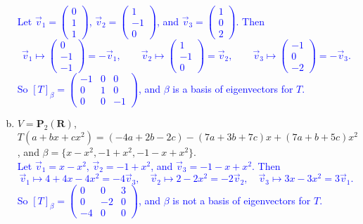 \documentclass[a4paper,11pt]{article}
\newcommand{\R}{\mathbf{R}}
\newcommand{\PP}{\mathbf{P}}
\newcommand{\blue}[1]{\textcolor{blue}{#1}}
\begin{document}
\begin{enumerate}[(a)]
  \blue{Let $\vec v_1 = \left( \begin{smallmatrix}0\\1\\1\end{smallmatrix}
    \right)$, $\vec v_2 = \left( \begin{smallmatrix}1\\-1\\0\end{smallmatrix}
    \right)$, and $\vec v_3 = \left( \begin{smallmatrix}1\\0\\2\end{smallmatrix}
    \right)$. Then
    \[
      \vec v_1 \mapsto
      \left(
        \begin{array}{r}
          0 \\ -1 \\ -1
        \end{array}
      \right) = -\vec v_1, \qquad
      \vec v_2 \mapsto
      \left(
        \begin{array}{r}
          1\\-1\\0
        \end{array}
      \right) = \vec v_2, \qquad
      \vec v_3 \mapsto
      \left(
        \begin{array}{r}
          -1\\0\\-2
        \end{array}
      \right) = - \vec v_3.
    \]
    So $[T]_\beta =
    \left( \begin{smallmatrix}-1&0&0\\0&1&0\\0&0&-1\end{smallmatrix} \right)$,
    and $\beta$ is a basis of eigenvectors for $T$. \\}

\item $V=\PP_2(\R)$, $T(a+bx+cx^2)=(-4a+2b-2c)-(7a+3b+7c)x+(7a+b+5c)x^2$, and
  $\beta=\{x-x^2,-1+x^2,-1-x+x^2\}$. \\

  \blue{Let $\vec v_1 = x-x^2$, $\vec v_2=-1+x^2$, and $\vec v_3=-1-x+x^2$. Then
    \[
      \vec v_1 \mapsto 4+4x-4x^2 = -4 \vec v_3, \quad
      \vec v_2 \mapsto 2-2x^2 = -2\vec v_2, \quad
      \vec v_3 \mapsto 3x-3x^2 = 3\vec v_1.
    \]
    So $[T]_\beta =
    \left( \begin{smallmatrix}0&0&3\\0&-2&0\\-4&0&0\end{smallmatrix} \right)$,
    and $\beta$ is not a basis of eigenvectors for $T$. \\}


\end{enumerate}
\end{document}
